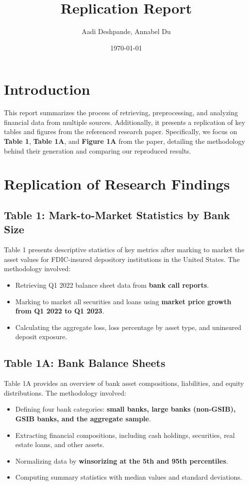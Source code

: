 \documentclass{article}
\title{Replication Report}
\author{Aadi Deshpande, Annabel Du}
\date{\today}
\begin{document}
\maketitle

\section{Introduction}
This report summarizes the process of retrieving, preprocessing, and analyzing financial data from multiple sources. Additionally, it presents a replication of key tables and figures from the referenced research paper. Specifically, we focus on \textbf{Table 1}, \textbf{Table 1A}, and \textbf{Figure 1A} from the paper, detailing the methodology behind their generation and comparing our reproduced results.

\section{Replication of Research Findings}

\subsection{Table 1: Mark-to-Market Statistics by Bank Size}
Table 1 presents descriptive statistics of key metrics after marking to market the asset values for FDIC-insured depository institutions in the United States. The methodology involved:

\begin{itemize}
    \item Retrieving Q1 2022 balance sheet data from \textbf{bank call reports}.
    \item Marking to market all securities and loans using \textbf{market price growth from Q1 2022 to Q1 2023}.
    \item Calculating the aggregate loss, loss percentage by asset type, and uninsured deposit exposure.
\end{itemize}

\subsection{Table 1A: Bank Balance Sheets}
Table 1A provides an overview of bank asset compositions, liabilities, and equity distributions. The methodology involved:

\begin{itemize}
    \item Defining four bank categories: \textbf{small banks, large banks (non-GSIB), GSIB banks, and the aggregate sample}.
    \item Extracting financial compositions, including cash holdings, securities, real estate loans, and other assets.
    \item Normalizing data by \textbf{winsorizing at the 5th and 95th percentiles}.
    \item Computing summary statistics with median values and standard deviations.
\end{itemize}
\end{document}
